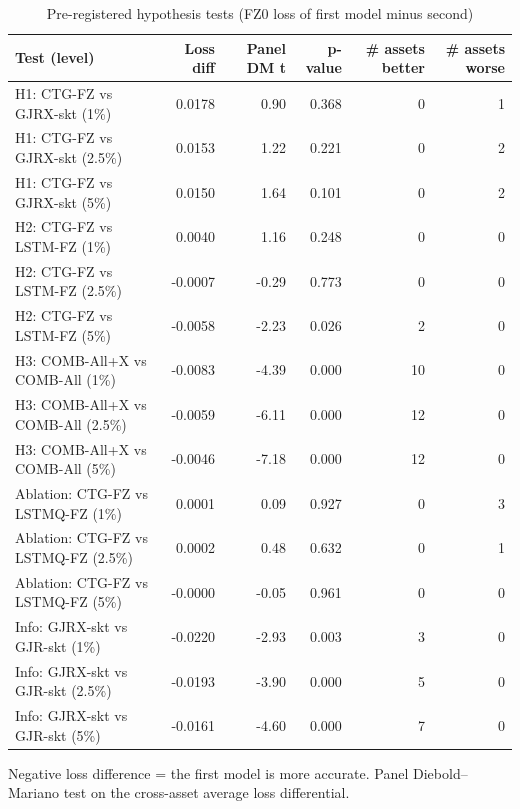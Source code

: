 \begin{table}[htbp]
\centering
\footnotesize
\caption{Pre-registered hypothesis tests (FZ0 loss of first model minus second)}
\label{tab:hyp}
\begin{tabular}{lrrrrr}
\toprule
Test (level) & Loss diff & Panel DM t & p-value & \# assets better & \# assets worse \\
\midrule
H1: CTG-FZ vs GJRX-skt (1\%) & 0.0178 & 0.90 & 0.368 & 0 & 1 \\
H1: CTG-FZ vs GJRX-skt (2.5\%) & 0.0153 & 1.22 & 0.221 & 0 & 2 \\
H1: CTG-FZ vs GJRX-skt (5\%) & 0.0150 & 1.64 & 0.101 & 0 & 2 \\
H2: CTG-FZ vs LSTM-FZ (1\%) & 0.0040 & 1.16 & 0.248 & 0 & 0 \\
H2: CTG-FZ vs LSTM-FZ (2.5\%) & -0.0007 & -0.29 & 0.773 & 0 & 0 \\
H2: CTG-FZ vs LSTM-FZ (5\%) & -0.0058 & -2.23 & 0.026 & 2 & 0 \\
H3: COMB-All+X vs COMB-All (1\%) & -0.0083 & -4.39 & 0.000 & 10 & 0 \\
H3: COMB-All+X vs COMB-All (2.5\%) & -0.0059 & -6.11 & 0.000 & 12 & 0 \\
H3: COMB-All+X vs COMB-All (5\%) & -0.0046 & -7.18 & 0.000 & 12 & 0 \\
Ablation: CTG-FZ vs LSTMQ-FZ (1\%) & 0.0001 & 0.09 & 0.927 & 0 & 3 \\
Ablation: CTG-FZ vs LSTMQ-FZ (2.5\%) & 0.0002 & 0.48 & 0.632 & 0 & 1 \\
Ablation: CTG-FZ vs LSTMQ-FZ (5\%) & -0.0000 & -0.05 & 0.961 & 0 & 0 \\
Info: GJRX-skt vs GJR-skt (1\%) & -0.0220 & -2.93 & 0.003 & 3 & 0 \\
Info: GJRX-skt vs GJR-skt (2.5\%) & -0.0193 & -3.90 & 0.000 & 5 & 0 \\
Info: GJRX-skt vs GJR-skt (5\%) & -0.0161 & -4.60 & 0.000 & 7 & 0 \\
\bottomrule
\end{tabular}
\par\smallskip\parbox{\linewidth}{\scriptsize Negative loss difference = the first model is more accurate. Panel Diebold--Mariano test on the cross-asset average loss differential.}
\end{table}